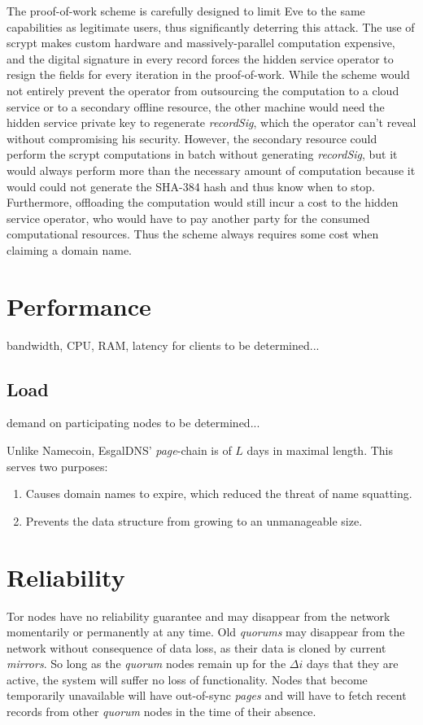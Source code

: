 The proof-of-work scheme is carefully designed to limit Eve to the same capabilities as legitimate users, thus significantly deterring this attack. The use of scrypt makes custom hardware and massively-parallel computation expensive, and the digital signature in every record forces the hidden service operator to resign the fields for every iteration in the proof-of-work. While the scheme would not entirely prevent the operator from outsourcing the computation to a cloud service or to a secondary offline resource, the other machine would need the hidden service private key to regenerate \emph{recordSig}, which the operator can't reveal without compromising his security. However, the secondary resource could perform the scrypt computations in batch without generating \emph{recordSig}, but it would always perform more than the necessary amount of computation because it would could not generate the SHA-384 hash and thus know when to stop. Furthermore, offloading the computation would still incur a cost to the hidden service operator, who would have to pay another party for the consumed computational resources. Thus the scheme always requires some cost when claiming a domain name. 

\section{Performance}

bandwidth, CPU, RAM, latency for clients to be determined...

\subsection{Load}

demand on participating nodes to be determined...

Unlike Namecoin, EsgalDNS' \emph{page}-chain is of $ L $ days in maximal length. This serves two purposes:

\begin{enumerate}
	\item Causes domain names to expire, which reduced the threat of name squatting.
	\item Prevents the data structure from growing to an unmanageable size.
\end{enumerate}

\section{Reliability}


Tor nodes have no reliability guarantee and may disappear from the network momentarily or permanently at any time. Old \emph{quorums} may disappear from the network without consequence of data loss, as their data is cloned by current \emph{mirrors}. So long as the \emph{quorum} nodes remain up for the $ \Delta i $ days that they are active, the system will suffer no loss of functionality. Nodes that become temporarily unavailable will have out-of-sync \emph{pages} and will have to fetch recent records from other \emph{quorum} nodes in the time of their absence. 



